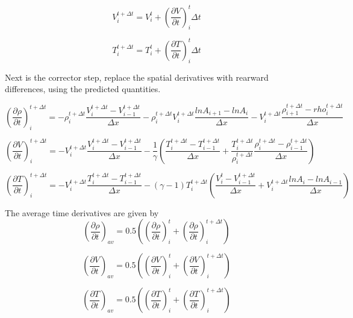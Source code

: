 \begin{equation}
V^{t+\Delta t}_i = V^t_i + (\frac{\partial V}{\partial t})^t_i \Delta t
\end{equation}

\begin{equation}
T^{t+\Delta t}_i = T^t_i + (\frac{\partial T}{\partial t})^t_i \Delta t
\end{equation}

Next is the corrector step, replace the spatial derivatives with rearward differences, using the predicted quantities.

\begin{equation}
(\frac{\partial \rho}{\partial t})^{t+\Delta t}_i=-\rho^{t+\Delta t}_i \frac{V^{t+\Delta t}_i-V^{t+\Delta t}_{i-1}}{\Delta x}-\rho^{t+\Delta t}_i V^{t+\Delta t}_i \frac{ln A_{i+1}-ln A_i}{\Delta x} -V^{t+\Delta t}_i \frac{\rho^{t+\Delta t}_{i+1} - rho^{t+\Delta t}_i}{\Delta x}
\end{equation}

\begin{equation}
(\frac{\partial V}{\partial t})^{t+\Delta t}_i=-V^{t+\Delta t}_i \frac{V^{t+\Delta t}_i-V^{t+\Delta t}_{i-1}}{\Delta x}-\frac{1}{\gamma}( \frac{T^{t+\Delta t}_i-T^{t+\Delta t}_{i-1}}{\Delta x}+\frac{T^{t+\Delta t}_i}{\rho^{t+\Delta t}_i} \frac{\rho^{t+\Delta t}_i-\rho^{t+\Delta t}_{i-1}}{\Delta x}  )
\end{equation}

\begin{equation}
(\frac{\partial T}{\partial t})^{t+\Delta t}_i = -V^{t+\Delta t}_i \frac{T^{t+\Delta t}_i-T^{t+\Delta t}_{i-1}}{\Delta x}-(\gamma-1)T^{t+\Delta t}_i(\frac{V^t_i-V^{t+\Delta t}_{i-1}}{\Delta x}+V^{t+\Delta t}_i \frac{ln A_i - ln A_{i-1}}{\Delta x})
\end{equation}

The average time derivatives are given by
\begin{equation}
(\frac{\partial \rho}{\partial t})_{av}=0.5( (\frac{\partial \rho}{\partial t})^t_i + ( \frac{\partial \rho}{\partial t})^{t+\Delta t}_i  )
\end{equation}

\begin{equation}
(\frac{\partial V}{\partial t})_{av}=0.5( (\frac{\partial V}{\partial t})^t_i + ( \frac{\partial V}{\partial t})^{t+\Delta t}_i  )
\end{equation}

\begin{equation}
(\frac{\partial T}{\partial t})_{av}=0.5( (\frac{\partial T}{\partial t})^t_i + ( \frac{\partial T}{\partial t})^{t+\Delta t}_i  )
\end{equation}

